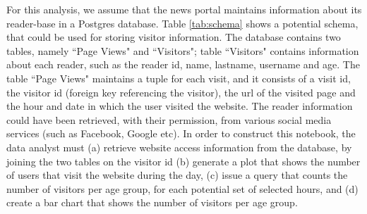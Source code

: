 

For this analysis, we assume that the news portal maintains information about its reader-base in a Postgres database. Table \ref{tab:schema} shows a potential schema, that could be used for storing visitor information. The database contains two tables, namely ``Page Views" and ``Visitors"; table ``Visitors" contains information about each reader, such as the reader id, name, lastname, username and age. The table ``Page Views" maintains a tuple for each visit, and it consists of a visit id, the visitor id (foreign key referencing the visitor), the url of the visited page and the hour and date in which the user visited the website. The reader information could have been retrieved, with their permission, from various social media services (such as Facebook, Google etc). In order to construct this notebook, the data analyst must (a) retrieve  website access information from the database, by joining the two tables on the visitor id (b) generate a plot that shows the number of users that visit the website during the day, (c) issue a query that counts the number of visitors per age group, for each potential set of selected hours, and (d) create a bar chart that shows the number of visitors per age group. 



